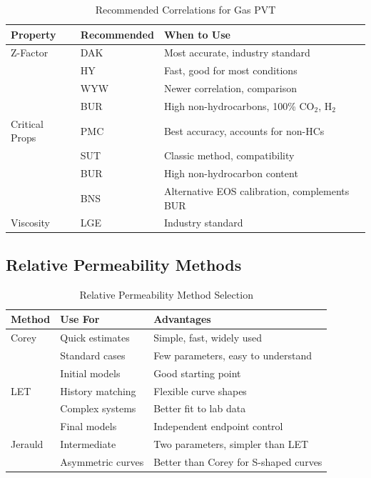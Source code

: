 \documentclass[11pt,a4paper]{article}
\begin{document}
\begin{table}[h]
\centering
\begin{tabular}{llp{7cm}}
\toprule
\textbf{Property} & \textbf{Recommended} & \textbf{When to Use} \\
\midrule
Z-Factor & DAK & Most accurate, industry standard \\
 & HY & Fast, good for most conditions \\
 & WYW & Newer correlation, comparison \\
 & BUR & High non-hydrocarbons, 100\% CO$_2$, H$_2$ \\
\midrule
Critical Props & PMC & Best accuracy, accounts for non-HCs \\
 & SUT & Classic method, compatibility \\
 & BUR & High non-hydrocarbon content \\
 & BNS & Alternative EOS calibration, complements BUR \\
\midrule
Viscosity & LGE & Industry standard \\
\bottomrule
\end{tabular}
\caption{Recommended Correlations for Gas PVT}
\end{table}

\subsection{Relative Permeability Methods}

\begin{table}[h]
\centering
\begin{tabular}{llp{7cm}}
\toprule
\textbf{Method} & \textbf{Use For} & \textbf{Advantages} \\
\midrule
Corey & Quick estimates & Simple, fast, widely used \\
 & Standard cases & Few parameters, easy to understand \\
 & Initial models & Good starting point \\
\midrule
LET & History matching & Flexible curve shapes \\
 & Complex systems & Better fit to lab data \\
 & Final models & Independent endpoint control \\
\midrule
Jerauld & Intermediate & Two parameters, simpler than LET \\
 & Asymmetric curves & Better than Corey for S-shaped curves \\
\bottomrule
\end{tabular}
\caption{Relative Permeability Method Selection}
\end{table}
\end{document}
